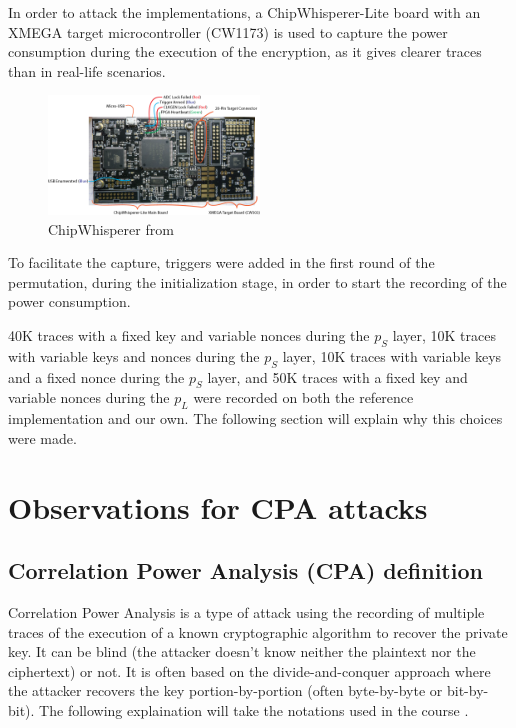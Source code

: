 \documentclass[a4paper,11pt,twocolumn]{article}
\begin{document}
		In order to attack the implementations, a ChipWhisperer-Lite board with an XMEGA target microcontroller (CW1173) is used to capture the power consumption during the execution of the encryption, as it gives clearer traces than in real-life scenarios.
		
		\begin{figure}[h]
			\includegraphics[width=0.5\textwidth]{cwlite_basic1}
			\caption{ChipWhisperer from \cite{cwdoc}}
			\label{fig:cw}
		\end{figure}
		
		To facilitate the capture, triggers were added in the first round of the permutation, during the initialization stage, in order to start the recording of the power consumption.
		
		40K traces with a fixed key and variable nonces during the $p_S$ layer, 10K traces with variable keys and nonces during the $p_S$ layer, 10K traces with variable keys and a fixed nonce during the $p_S$ layer, and 50K traces with a fixed key and variable nonces during the $p_L$ were recorded on both the reference implementation and our own. The following section will explain why this choices were made.
		
		\section{Observations for CPA attacks}
		\subsection{Correlation Power Analysis (CPA) definition}
		Correlation Power Analysis is a type of attack using the recording of multiple traces of the execution of a known cryptographic algorithm to recover the private key. It can be blind (the attacker doesn't know neither the plaintext nor the ciphertext) or not. It is often based on the divide-and-conquer approach where the attacker recovers the key portion-by-portion (often byte-by-byte or bit-by-bit). The following explaination will take the notations used in the course \cite{cours}.
		
\end{document}
